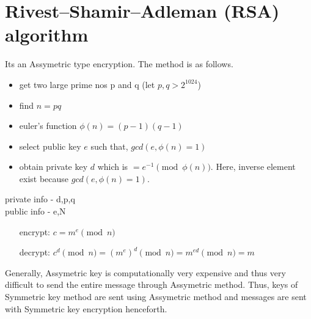 \documentclass[english, 11pt]{article}
\begin{document}
\section*{Rivest–Shamir–Adleman (RSA) algorithm}
Its an Assymetric type encryption. The method is as follows.
\begin{itemize}
  \item get two large prime nos p and q (let $p,q > 2^1024$)
  \item find $n = pq$
  \item euler's function $\phi(n) = (p-1)(q-1)$
  \item select public key $e$ such that, $gcd(e,\phi(n) = 1)$
  \item obtain private key $d$ which is $= e^{-1} \pmod{\phi(n)} $. Here, inverse element exist because $gcd(e,\phi(n) = 1)$.
\end{itemize}
private info - d,p,q \\
public info - e,N
\begin{itemize}
  \item[encrypt:] $c = m^e \pmod{n}$
  \item[decrypt:] $c^d \pmod{n} = (m^e)^d \pmod{n} = m^{ed} \pmod{n} = m$ 
\end{itemize}
Generally, Assymetric key is computationally very expensive and thus very difficult to send the entire message through Assymetric method. Thus, keys of Symmetric key method are sent using Assymetric method and messages are sent with Symmetric key encryption henceforth.
\end{document}
